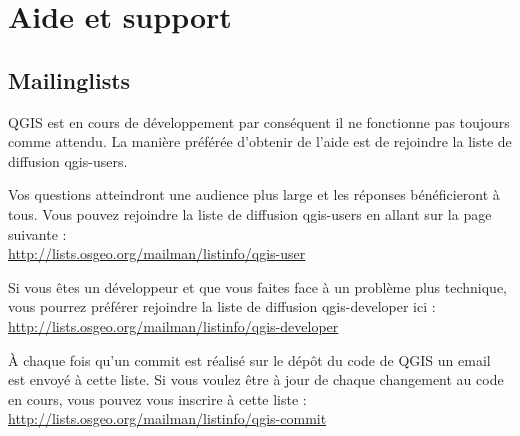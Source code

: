 \section{Aide et support}\label{label_helpsupport}


\subsection{Mailinglists}
QGIS est en cours de développement par conséquent il ne fonctionne pas toujours
comme attendu. La manière préférée d'obtenir de l'aide est de rejoindre la
liste de diffusion qgis-users.

Vos questions atteindront une audience plus large et les réponses bénéficieront
à tous. Vous pouvez rejoindre la liste de diffusion qgis-users en allant sur la
page suivante : \\
\url{http://lists.osgeo.org/mailman/listinfo/qgis-user}

Si vous êtes un développeur et que vous faites face à un problème plus
technique, vous pourrez préférer rejoindre la liste de diffusion qgis-developer
ici :\\
\url{http://lists.osgeo.org/mailman/listinfo/qgis-developer}

À chaque fois qu'un commit est réalisé sur le dépôt du code de QGIS un email
est envoyé à cette liste. Si vous voulez être à jour de chaque changement au
code en cours, vous pouvez vous inscrire à cette liste :\\
\url{http://lists.osgeo.org/mailman/listinfo/qgis-commit}

